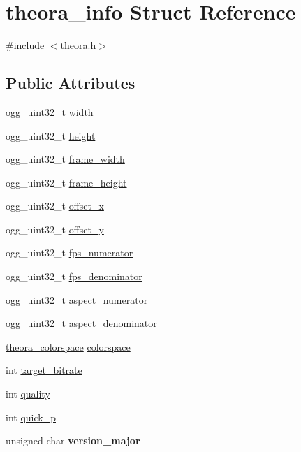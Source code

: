\hypertarget{structtheora__info}{\section{theora\+\_\+info Struct Reference}
\label{structtheora__info}
}


{\ttfamily \#include $<$theora.\+h$>$}

\subsection*{Public Attributes}
\begin{DoxyCompactItemize}
\item 
ogg\+\_\+uint32\+\_\+t \hyperlink{structtheora__info_a17c2fc651bb3329f1ea6b13ff1d3957b}{width}
\item 
ogg\+\_\+uint32\+\_\+t \hyperlink{structtheora__info_ae6f0274fc4a7f285c422d91abb35f9c6}{height}
\item 
ogg\+\_\+uint32\+\_\+t \hyperlink{structtheora__info_a8f28f4018a25634d40e4ae861fbbccfa}{frame\+\_\+width}
\item 
ogg\+\_\+uint32\+\_\+t \hyperlink{structtheora__info_a287e4c194f1d2e6deb39d59f1748ea48}{frame\+\_\+height}
\item 
ogg\+\_\+uint32\+\_\+t \hyperlink{structtheora__info_af5949a02bef29512f2705e6f6c944e3b}{offset\+\_\+x}
\item 
ogg\+\_\+uint32\+\_\+t \hyperlink{structtheora__info_a91c3922097ba32a85acd584a01dc2c93}{offset\+\_\+y}
\item 
ogg\+\_\+uint32\+\_\+t \hyperlink{structtheora__info_a3478199aa5ab213816c1819f70085ad7}{fps\+\_\+numerator}
\item 
ogg\+\_\+uint32\+\_\+t \hyperlink{structtheora__info_a9aa7e826e0323a4ae8cd8646a6cfbfea}{fps\+\_\+denominator}
\item 
ogg\+\_\+uint32\+\_\+t \hyperlink{structtheora__info_a5a3ed8c79815fba1aa06c3f7d8e48b35}{aspect\+\_\+numerator}
\item 
ogg\+\_\+uint32\+\_\+t \hyperlink{structtheora__info_afebc4d0cbfb34b68c833a8c79e83ae12}{aspect\+\_\+denominator}
\item 
\hyperlink{group__oldfuncs_gaa567da4ce591f7373149ce3ef3acdac9}{theora\+\_\+colorspace} \hyperlink{structtheora__info_a5eaba99c96706d47b426ab7b7602dc5d}{colorspace}
\item 
int \hyperlink{structtheora__info_a0cfba041767ae2416dd190a406afe713}{target\+\_\+bitrate}
\item 
int \hyperlink{structtheora__info_a71a4748a5f31bd58d0e403b7806c980d}{quality}
\item 
int \hyperlink{structtheora__info_a2dfae4fd175dbd19254eaf0697778ff5}{quick\+\_\+p}
\item 
\hypertarget{structtheora__info_a7c5ebb9e6700aaef87f29f7c6074e474}{unsigned char {\bfseries version\+\_\+major}}\label{structtheora__info_a7c5ebb9e6700aaef87f29f7c6074e474}


\end{DoxyCompactItemize}
